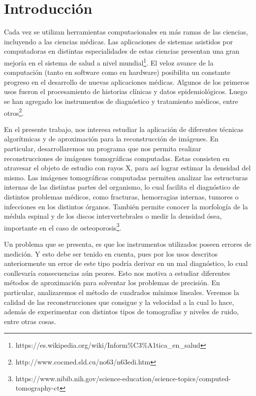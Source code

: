 \section{Introducción}
\label{sec:introduccion}
Cada vez se utilizan herramientas computacionales en más ramas de las ciencias, incluyendo a las ciencias médicas.
Las aplicaciones de sistemas asistidos por computadoras en distintas especialidades de estas ciencias
presentan una gran mejoría en el sistema de salud a nivel mundial\footnote{https://es.wikipedia.org/wiki/Inform\%C3\%A1tica\_en\_salud}.
El veloz avance de la computación (tanto en software como en hardware)
posibilita un constante progreso en el desarrollo de nuevas aplicaciones médicas.
Algunos de los primeros usos fueron el procesamiento de historias clínicas y datos epidemiológicos.
Luego se han agregado los instrumentos de diagnóstico y tratamiento médicos, entre otros\footnote{http://www.cocmed.sld.cu/no63/n63edi.htm}.

En el presente trabajo, nos interesa estudiar la aplicación de diferentes técnicas algorítmicas
y de aproximación para la reconstrucción de imágenes.
En particular, desarrollaremos un programa que nos permita realizar reconstrucciones de imágenes tomográficas computadas.
Estas consisten en atravesar el objeto de estudio con rayos X,
para así lograr estimar la densidad del mismo.
Las imágenes tomográficas computadas permiten analizar las estructuras internas de las distintas partes del organismo,
lo cual facilita el diagnóstico de distintos problemas médicos, como fracturas, hemorragias internas, tumores o infecciones en los distintos órganos.
También permite conocer la morfología de la médula espinal y de los discos intervertebrales
o medir la densidad ósea, importante en el caso de osteoporosis\footnote{https://www.nibib.nih.gov/science-education/science-topics/computed-tomography-ct}.

Un problema que se presenta, es que los instrumentos utilizados poseen errores de medición.
Y esto debe ser tenido en cuenta, pues por los usos descritos anteriormente un error de este tipo
podría derivar en un mal diagnóstico,
lo cual conllevaría consecuencias aún peores.
Esto nos motiva a estudiar diferentes métodos de aproximación para solventar los problemas de precisión.
En particular, analizaremos el método de cuadrados mínimos lineales.
Veremos la calidad de las reconstrucciones que consigue y la velocidad a la cual lo hace,
además de experimentar con distintos tipos de tomografías y niveles de ruido, entre otras cosas.